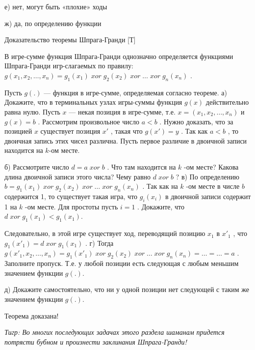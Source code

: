 \begin{problem}
\begin{sol}
е) нет, могут быть «плохие» ходы \par
ж) да, по определению функции
\end{sol}
\end{problem}



\begin{problem}
 Доказательство теоремы Шпрага-Гранди [Т]\par
{}\par
В игре-сумме функция Шпрага-Гранди однозначно определяется функциями Шпрага-Гранди игр-слагаемых по правилу:  $g\left(x_{1} ,x_{2} ,\ldots ,x_{n} \right)=g_{1} \left(x_{1} \right)\; xor\; g_{2} \left(x_{2} \right)\; xor\; \ldots \; xor\; g_{n} \left(x_{n} \right)$ .
\par
Пусть  $g\left(.\right)$  — функция в игре-сумме, определяемая согласно теореме.
а)	Докажите, что в терминальных узлах игры-суммы функция  $g\left(x\right)$  действительно равна нулю.
Пусть  $x$  — некая позиция в игре-сумме, т.е.  $x=\left(x_{1} ,x_{2} ,\ldots ,x_{n} \right)$  и  $g\left(x\right)=b$ . Рассмотрим произвольное число  $a<b$ . Нужно доказать, что за позицией  $x$  существует позиция  $x'$ , такая что  $g\left(x'\right)=y$ .
Так как  $a<b$ , то двоичная запись этих чисел различна. Пусть первое различие в двоичной записи находится на  $k$-ом месте.\par
б)	Рассмотрите число  $d=a\; xor\; b$ . Что там находится на  $k$ -ом месте? Какова длина двоичной записи этого числа? Чему равно  $d\; xor\; b$ ?
в)	По определению  $b=g_{1} \left(x_{1} \right)\; xor\; g_{2} \left(x_{2} \right)\; xor\; \ldots \; xor\; g_{n} \left(x_{n} \right)$ . Так как на  $k$ -ом месте в числе  $b$  содержится 1, то существует такая игра, что  $g_{i} \left(x_{i} \right)$  в двоичной записи содержит 1 на  $k$ -ом месте. Для простоты пусть  $i=1$ . Докажите, что  $d\; xor\; g_{1} \left(x_{1} \right)<g_{1} \left(x_{1} \right)$.\par
Следовательно, в этой игре существует ход, переводящий позицию  $x_{1} $  в  $x'_{1} $ , что  $g_{1} \left(x'_{1} \right)=d\; xor\; g_{1} \left(x_{1} \right)$ .
г)	Тогда  $g\left(x'_{1} ,x_{2} ,\ldots ,x_{n} \right)=g_{1} \left(x'_{1} \right)\; xor\; g_{2} \left(x_{2} \right)\; xor\; \ldots \; xor\; g_{n} \left(x_{n} \right)=\ldots =\ldots =a$ . Заполните пропуск.
Т.е. у любой позиции есть следующая с любым меньшим значением функции  $g\left(.\right)$.\par
д)	Докажите самостоятельно, что ни у одной позиции нет следующей с таким же значением функции  $g\left(.\right)$.\par
Теорема доказана!\par

{\it Тигр: Во многих последующих задачах этого раздела  шаманам придется потрясти бубном и произнести заклинания Шпрага-Гранди!}




\begin{sol}

\end{sol}
\end{problem}



